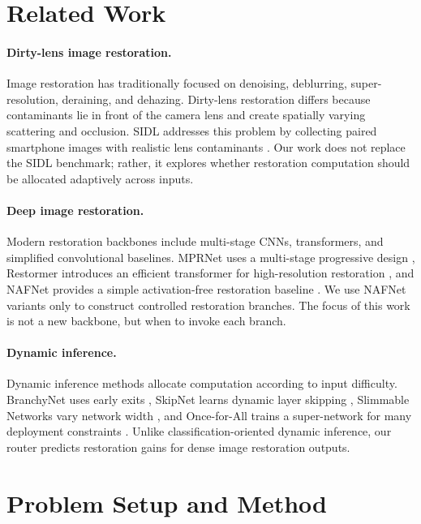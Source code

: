 \documentclass[11pt]{article}
\begin{document}
\section{Related Work}

\paragraph{Dirty-lens image restoration.}
Image restoration has traditionally focused on denoising, deblurring, super-resolution, deraining, and dehazing.
Dirty-lens restoration differs because contaminants lie in front of the camera lens and create spatially varying scattering and occlusion.
SIDL addresses this problem by collecting paired smartphone images with realistic lens contaminants \cite{sidl2025}.
Our work does not replace the SIDL benchmark; rather, it explores whether restoration computation should be allocated adaptively across inputs.

\paragraph{Deep image restoration.}
Modern restoration backbones include multi-stage CNNs, transformers, and simplified convolutional baselines.
MPRNet uses a multi-stage progressive design \cite{mprnet2021}, Restormer introduces an efficient transformer for high-resolution restoration \cite{restormer2022}, and NAFNet provides a simple activation-free restoration baseline \cite{nafnet2022}.
We use NAFNet variants only to construct controlled restoration branches.
The focus of this work is not a new backbone, but when to invoke each branch.

\paragraph{Dynamic inference.}
Dynamic inference methods allocate computation according to input difficulty.
BranchyNet uses early exits \cite{branchynet2016}, SkipNet learns dynamic layer skipping \cite{skipnet2018}, Slimmable Networks vary network width \cite{slimmable2019}, and Once-for-All trains a super-network for many deployment constraints \cite{onceforall2020}.
Unlike classification-oriented dynamic inference, our router predicts restoration gains for dense image restoration outputs.

\section{Problem Setup and Method}
\end{document}
